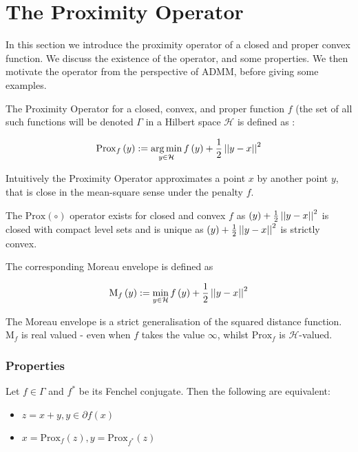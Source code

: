 \section{The Proximity Operator}\label{sec:prox}

In this section we introduce the proximity operator of a closed and proper convex function. We discuss the existence of the operator, and some properties. We then motivate the operator from the perspective of ADMM, before giving some examples.

The Proximity Operator for a closed, convex, and proper function \(f\) (the set of all such functions will be denoted \(\Gamma\) in a Hilbert space \(\mathcal{H}\) is defined as \cite{moreau1965proximite}:

\begin{definition}\label{def:prox_operator}
\begin{equation}
\mathrm{Prox}_f\left(y\right) :=  \operatorname*{arg\,min}_{y \in \mathcal{H} } f\left(y\right) + \frac{1}{2}\left|\left|y-x\right|\right|^2
\end{equation}
\end{definition}

Intuitively the Proximity Operator approximates a point \(x\) by another point \(y\), that is close in the mean-square sense under the penalty \(f\).

The \(\mathrm{Prox}\left(\circ\right)\) operator exists for closed and convex \(f\) as \(\left(y\right) + \frac{1}{2}\left|\left|y-x\right|\right|^2\) is closed with compact level sets and is unique as \(\left(y\right) + \frac{1}{2}\left|\left|y-x\right|\right|^2\) is strictly convex.

The corresponding Moreau envelope is defined as 

\begin{definition}
\begin{equation}
\mathrm{M}_f\left(y\right) :=  \min_{y \in \mathcal{H}} f\left(y\right) + \frac{1}{2}\left|\left|y-x\right|\right|^2
\end{equation}
\end{definition}

The Moreau envelope is a strict generalisation of the squared distance function. \(\mathrm{M}_f\) is real valued - even when \(f\) takes the value \(\infty\), whilst \(\mathrm{Prox}_f \) is \(\mathcal{H}\)-valued. 

\subsubsection{Properties}
\begin{theorem}[Moreau '65]
Let \(f \in \Gamma\) and \(f^*\) be its Fenchel conjugate. Then the following are equivalent:
\begin{itemize}
\item \(z = x+y, y \in \partial f\left(x\right)\)
\item \(x = \mathrm{Prox}_f\left(z\right), y = \mathrm{Prox}_{f^*}\left(z\right)  \)
\end{itemize}
\end{theorem}

